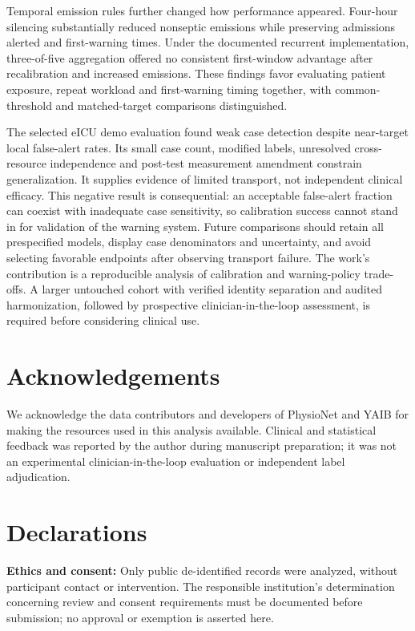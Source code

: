 \documentclass[preprint,12pt]{elsarticle}
\begin{document}
Temporal emission rules further changed how performance appeared. Four-hour silencing substantially reduced nonseptic emissions while preserving admissions alerted and first-warning times. Under the documented recurrent implementation, three-of-five aggregation offered no consistent first-window advantage after recalibration and increased emissions. These findings favor evaluating patient exposure, repeat workload and first-warning timing together, with common-threshold and matched-target comparisons distinguished.

The selected eICU demo evaluation found weak case detection despite near-target local false-alert rates. Its small case count, modified labels, unresolved cross-resource independence and post-test measurement amendment constrain generalization. It supplies evidence of limited transport, not independent clinical efficacy. This negative result is consequential: an acceptable false-alert fraction can coexist with inadequate case sensitivity, so calibration success cannot stand in for validation of the warning system. Future comparisons should retain all prespecified models, display case denominators and uncertainty, and avoid selecting favorable endpoints after observing transport failure. The work's contribution is a reproducible analysis of calibration and warning-policy trade-offs. A larger untouched cohort with verified identity separation and audited harmonization, followed by prospective clinician-in-the-loop assessment, is required before considering clinical use.

\FloatBarrier
\section*{Acknowledgements}
We acknowledge the data contributors and developers of PhysioNet and YAIB for making the resources used in this analysis available. Clinical and statistical feedback was reported by the author during manuscript preparation; it was not an experimental clinician-in-the-loop evaluation or independent label adjudication.

\section*{Declarations}
\textbf{Ethics and consent:} Only public de-identified records were analyzed, without participant contact or intervention. The responsible institution's determination concerning review and consent requirements must be documented before submission; no approval or exemption is asserted here.
\end{document}
